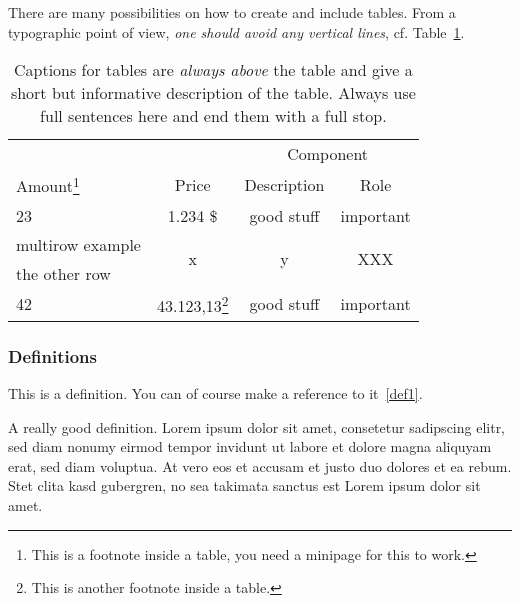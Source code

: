 There are many possibilities on how to create and include tables. From a typographic point of view, \textit{one should avoid any vertical lines}, cf. Table~\ref{tab1}.


\begin{table}[htbp]
	\centering
	\begin{minipage}{\textwidth} %
	\renewcommand{\footnoterule}{}
 	\renewcommand{\thefootnote}{\alph{footnote}}
	\centering
	\caption[This is the short caption for the \textit{List of Tables}.]{Captions for tables are \emph{always above} the table and give a short but informative description of the table. Always use full sentences here and end them with a full stop.}
	\label{tab1}
	\begin{tabular}{@{}lccc@{}} \toprule
	& & \multicolumn{2}{c}{Component}\\
	\cmidrule{3-4}
	Amount\footnote{This is a footnote inside a table, you need a minipage for this to work.} & Price & Description & Role \\
	\midrule
	23 & 1.234 \$ & good stuff & important\\
	\midrule
	multirow example & \multirow{2}{*}{x} & \multirow{2}{*}{y} & \multirow{2}{*}{XXX} \\
	the other row & & &\\
	\midrule
	42 & 43.123,13\footnote{This is another footnote inside a table.} & good stuff & important\\
	\bottomrule
	\end{tabular}
	\end{minipage}
\end{table}


\subsubsection{Definitions}

This is a definition. You can of course make a reference to it~\ref{def1}.

\begin{definition}[A name]\label{def1}
 A really good definition. Lorem ipsum dolor sit amet, consetetur sadipscing elitr, sed diam nonumy eirmod tempor invidunt ut labore et dolore magna aliquyam erat, sed diam voluptua. At vero eos et accusam et justo duo dolores et ea rebum. Stet clita kasd gubergren, no sea takimata sanctus est Lorem ipsum dolor sit amet.
\end{definition}


